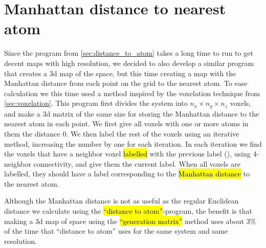 \section{Manhattan distance to nearest atom\label{sec:generation_matrix}}
Since the program from \cref{sec:distance_to_atom} takes a long time to run to get decent maps with high resolution, we decided to also develop a similar program that creates a 3d map of the space, but this time creating a map with the Manhattan distance from each point on the grid to the nearest atom. To ease calculation we this time used a method inspired by the voxelation technique from \cref{sec:voxelation}. This program first divides the system into $n_x\times n_y\times n_z$ voxels, and make a 3d matrix of the same size for storing the Manhattan distance to the nearest atom in each point. We first give all voxels with one or more atoms in them the distance 0. We then label the rest of the voxels using an iterative method, increasing the number by one for each iteration. In each iteration we find the voxels that have a neighbor voxel \hl{labelled} with the previous label (), using 4-neighbor connectivity, and give them the current label. When all voxels are labelled, they should have a label corresponding to the \hl{Manhattan distance} to the nearest atom.

Although the Manhattan distance is not as useful as the regular Euclidean distance we calculate using the \hl{``distance to atom''}-program, the benefit is that making a 3d map of space using the \hl{``generation matrix''} method uses about 3\% of the time that ``distance to atom'' uses for the same system and same resolution. 


